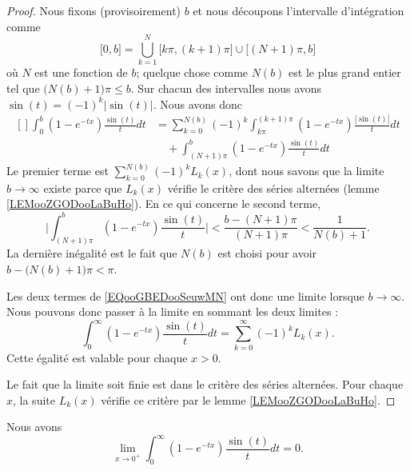 \begin{proof}
	Nous fixons (provisoirement) \( b\) et nous découpons l'intervalle d'intégration comme
	\begin{equation}
		\mathopen[ 0 , b \mathclose]=\bigcup_{k=1}^N\mathopen[ k\pi , (k+1)\pi \mathclose]\cup\mathopen\big[ (N+1)\pi  , b \mathclose\big]
	\end{equation}
	où \( N\) est une fonction de \( b\); quelque chose comme \( N(b)\) est le plus grand entier tel que \(\big( N(b)+1 \big)\pi\leq b\). Sur chacun des intervalles nous avons \( \sin(t)=(-1)^k| \sin(t) |\). Nous avons donc
	\begin{equation}       \label{EQooGBEDooSeuwMN}
		\begin{aligned}[]
			\int_0^b(1- e^{-tx})\frac{ \sin(t) }{ t }dt & =\sum_{k=0}^{N(b)}(-1)^k\int_{k\pi}^{(k+1)\pi}(1- e^{-tx})\frac{ | \sin(t) | }{ t }dt \\
			                                            & \quad+\int_{(N+1)\pi}^b(1- e^{-tx})\frac{ \sin(t) }{ t }dt
		\end{aligned}
	\end{equation}
	Le premier terme est \( \sum_{k=0}^{N(b)}(-1)^kL_k(x)\), dont nous savons que la limite \( b\to \infty\) existe parce que \( L_k(x)\) vérifie le critère des séries alternées (lemme \ref{LEMooZGODooLaBuHo}). En ce qui concerne le second terme,
	\begin{equation}
		\big|\int_{(N+1)\pi}^b (1- e^{-tx})\frac{ \sin(t) }{ t }\big| <  \frac{  b-( N+1 )\pi    }{ ( N+1 )\pi }<\frac{1}{ N(b)+1 }.
	\end{equation}
	La dernière inégalité est le fait que \( N(b)\) est choisi pour avoir \( b-\big( N(b)+1 \big)\pi<\pi\).

	Les deux termes de \eqref{EQooGBEDooSeuwMN} ont donc une limite lorsque \( b\to \infty\). Nous pouvons donc passer à la limite en sommant les deux limites :
	\begin{equation}
		\int_0^{\infty}(1- e^{-tx})\frac{ \sin(t) }{ t }dt=\sum_{k=0}^{\infty}(-1)^kL_k(x).
	\end{equation}
	Cette égalité est valable pour chaque \( x>0\).

	Le fait que la limite soit finie est dans le critère des séries alternées. Pour chaque \( x\), la suite \( L_k(x)\) vérifie ce critère par le lemme \ref{LEMooZGODooLaBuHo}.
\end{proof}

\begin{lemma}       \label{LEMooNZVSooDbZCZx}
	Nous avons
	\begin{equation}
		\lim_{x\to 0^+} \int_0^{\infty}(1- e^{-tx})\frac{ \sin(t) }{ t }dt=0.
	\end{equation}
\end{lemma}

